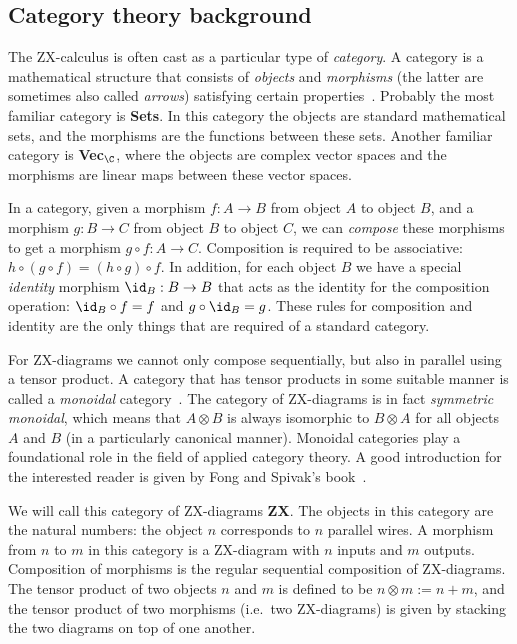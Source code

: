 \documentclass[a4paper,onecolumn,superscriptaddress,11pt,%
				unpublished,%
				allowfontchageintitle,%
				]{quantumarticle}
\begin{document}
\subsection{Category theory background}

The ZX-calculus is often cast as a particular type of \emph{category}. A category is a mathematical structure that consists of \emph{objects} and \emph{morphisms} (the latter are sometimes also called \emph{arrows}) satisfying certain properties~\cite{mac2013categories}. Probably the most familiar category is \textbf{Sets}. In this category the objects are standard mathematical sets, and the morphisms are the functions between these sets.
Another familiar category is \textbf{Vec}$_\C$, where the objects are complex vector spaces and the morphisms are linear maps between these vector spaces.

In a category, given a morphism $f:A\rightarrow B$ from object $A$ to object $B$, and a morphism $g:B\rightarrow C$ from object $B$ to object $C$, we can \emph{compose} these morphisms to get a morphism $g\circ f:A\rightarrow C$. Composition is required to be associative: $h\circ (g\circ f) = (h\circ g)\circ f$. In addition, for each object $B$ we have a special \emph{identity} morphism $\id_B:B\rightarrow B$ that acts as the identity for the composition operation: $\id_B\circ f = f$ and $g\circ \id_B = g$.
These rules for composition and identity are the only things that are required of a standard category.

For ZX-diagrams we cannot only compose sequentially, but also in parallel using a tensor product. A category that has tensor products in some suitable manner is called a \emph{monoidal} category~\cite{selinger2010survey}. The category of ZX-diagrams is in fact \emph{symmetric monoidal}, which means that $A\otimes B$ is always isomorphic to $B\otimes A$ for all objects $A$ and $B$ (in a particularly canonical manner). Monoidal categories play a foundational role in the field of applied category theory. A good introduction for the interested reader is given by Fong and Spivak's book~\cite{fong2019invitation}.

We will call this category of ZX-diagrams \textbf{ZX}. The objects in this category are the natural numbers: the object $n$ corresponds to $n$ parallel wires. A morphism from $n$ to $m$ in this category is a ZX-diagram with $n$ inputs and $m$ outputs. Composition of morphisms is the regular sequential composition of ZX-diagrams. The tensor product of two objects $n$ and $m$ is defined to be $n\otimes m:= n+m$, and the tensor product of two morphisms (i.e.~two ZX-diagrams) is given by stacking the two diagrams on top of one another.
\end{document}
